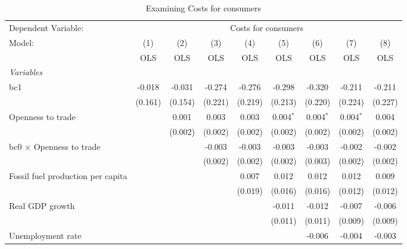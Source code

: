 
\begin{table}[htbp]
   \caption{Examining Costs for consumers}
   \centering
   \begin{tabular}{lcccccccc}
      \toprule
      Dependent Variable: & \multicolumn{8}{c}{Costs for consumers}\\
      Model:                                  & (1)     & (2)     & (3)     & (4)     & (5)         & (6)         & (7)         & (8)\\  
                                              &  OLS    & OLS     & OLS     & OLS     & OLS         & OLS         & OLS         & OLS\\  
      \midrule
      \emph{Variables}\\
      bc1                                     & -0.018  & -0.031  & -0.274  & -0.276  & -0.298      & -0.320      & -0.211      & -0.211\\   
                                              & (0.161) & (0.154) & (0.221) & (0.219) & (0.213)     & (0.220)     & (0.224)     & (0.227)\\   
      Openness to trade                       &         & 0.001   & 0.003   & 0.003   & 0.004$^{*}$ & 0.004$^{*}$ & 0.004$^{*}$ & 0.004\\   
                                              &         & (0.002) & (0.002) & (0.002) & (0.002)     & (0.002)     & (0.002)     & (0.002)\\   
      bc0 $\times$ Openness to trade          &         &         & -0.003  & -0.003  & -0.003      & -0.003      & -0.002      & -0.002\\   
                                              &         &         & (0.002) & (0.002) & (0.002)     & (0.003)     & (0.002)     & (0.002)\\   
      Fossil fuel production per capita       &         &         &         & 0.007   & 0.012       & 0.012       & 0.012       & 0.009\\   
                                              &         &         &         & (0.019) & (0.016)     & (0.016)     & (0.012)     & (0.012)\\   
      Real GDP growth                         &         &         &         &         & -0.011      & -0.012      & -0.007      & -0.006\\   
                                              &         &         &         &         & (0.011)     & (0.011)     & (0.009)     & (0.009)\\   
      Unemployment rate                       &         &         &         &         &             & -0.006      & -0.004      & -0.003\\   

\end{tabular}
\end{table}
